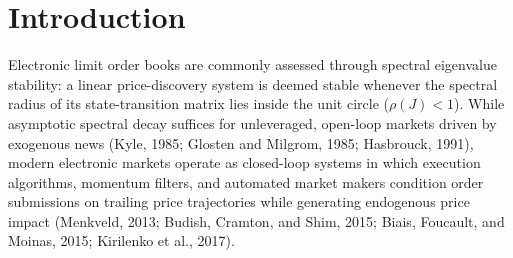 \documentclass[11pt]{article}
\theoremstyle{remark}
\begin{document}
\setcounter{page}{1}

\section{Introduction}
Electronic limit order books are commonly assessed through spectral eigenvalue stability: a linear price-discovery system is deemed stable whenever the spectral radius of its state-transition matrix lies inside the unit circle ($\rho(J) < 1$). While asymptotic spectral decay suffices for unleveraged, open-loop markets driven by exogenous news (Kyle, 1985; Glosten and Milgrom, 1985; Hasbrouck, 1991), modern electronic markets operate as closed-loop systems in which execution algorithms, momentum filters, and automated market makers condition order submissions on trailing price trajectories while generating endogenous price impact (Menkveld, 2013; Budish, Cramton, and Shim, 2015; Biais, Foucault, and Moinas, 2015; Kirilenko et al., 2017).
\end{document}
